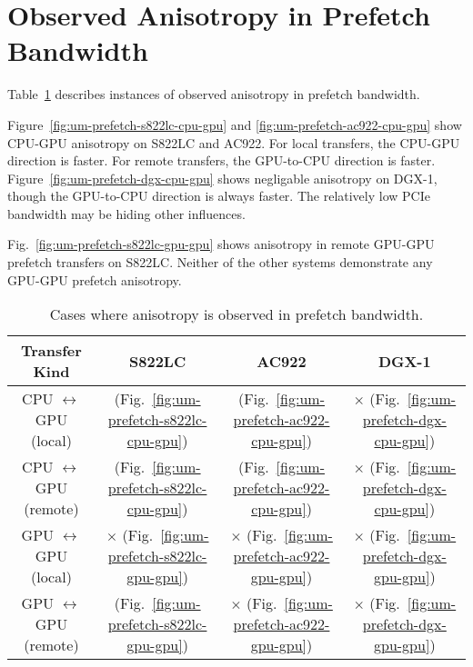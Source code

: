 \section{Observed Anisotropy in Prefetch Bandwidth}

Table~\ref{tab:um-prefetch-anisotropy} describes instances of observed anisotropy in prefetch bandwidth.

Figure~\ref{fig:um-prefetch-s822lc-cpu-gpu} and \ref{fig:um-prefetch-ac922-cpu-gpu} show CPU-GPU anisotropy on S822LC and AC922.
For local transfers, the CPU-GPU direction is faster.
For remote transfers, the GPU-to-CPU direction is faster.
Figure~\ref{fig:um-prefetch-dgx-cpu-gpu} shows negligable anisotropy on DGX-1, though the GPU-to-CPU direction is always faster.
The relatively low PCIe bandwidth may be hiding other influences.

Fig.~\ref{fig:um-prefetch-s822lc-gpu-gpu} shows anisotropy in remote GPU-GPU prefetch transfers on S822LC.
Neither of the other systems demonstrate any GPU-GPU prefetch anisotropy.

\begin{table}[ht]
	\centering
	\caption[Anisotropy in Prefetch Bandwidth]{
		Cases where anisotropy is observed in prefetch bandwidth.
	}
	\label{tab:um-prefetch-anisotropy}
	\begin{tabular}{cccc}
		\hline
		\textbf{Transfer Kind}             & \textbf{S822LC}                                         & \textbf{AC922}                                         & \textbf{DGX-1}                            \\ \hline 
		CPU $\leftrightarrow$ GPU (local)  & \checkmark (Fig.~\ref{fig:um-prefetch-s822lc-cpu-gpu}) & \checkmark (Fig.~\ref{fig:um-prefetch-ac922-cpu-gpu}) & $\times$ (Fig.~\ref{fig:um-prefetch-dgx-cpu-gpu}) \\ \hline
		CPU $\leftrightarrow$ GPU (remote) & \checkmark (Fig.~\ref{fig:um-prefetch-s822lc-cpu-gpu}) & \checkmark (Fig.~\ref{fig:um-prefetch-ac922-cpu-gpu}) & $\times$ (Fig.~\ref{fig:um-prefetch-dgx-cpu-gpu}) \\ \hline
		GPU $\leftrightarrow$ GPU (local)  & $\times$   (Fig.~\ref{fig:um-prefetch-s822lc-gpu-gpu}) & $\times$   (Fig.~\ref{fig:um-prefetch-ac922-gpu-gpu}) & $\times$ (Fig.~\ref{fig:um-prefetch-dgx-gpu-gpu}) \\ \hline
		GPU $\leftrightarrow$ GPU (remote) & \checkmark (Fig.~\ref{fig:um-prefetch-s822lc-gpu-gpu}) & $\times$   (Fig.~\ref{fig:um-prefetch-ac922-gpu-gpu}) & $\times$ (Fig.~\ref{fig:um-prefetch-dgx-gpu-gpu}) \\ \hline
	\end{tabular}
\end{table}

